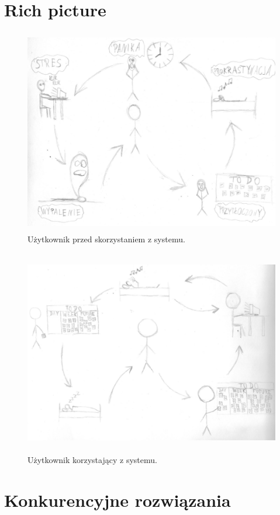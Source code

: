 \documentclass[a4paper,11pt]{report}
\begin{document}
\section {Rich picture}
\begin{figure}[h]
	\centering
	\includegraphics[width=\textwidth, height=9cm]{richpicture1}
	\caption{Użytkownik przed skorzystaniem z systemu.}
	\label{fig:rich1}
\end{figure}
\begin{figure}[h]
	\centering
	\includegraphics[width=\textwidth, height=9cm]{richpicture2}
	\caption{Użytkownik korzystający z systemu.}
	\label{fig:rich2}
\end{figure}
\section {Konkurencyjne rozwiązania}
\end{document}
